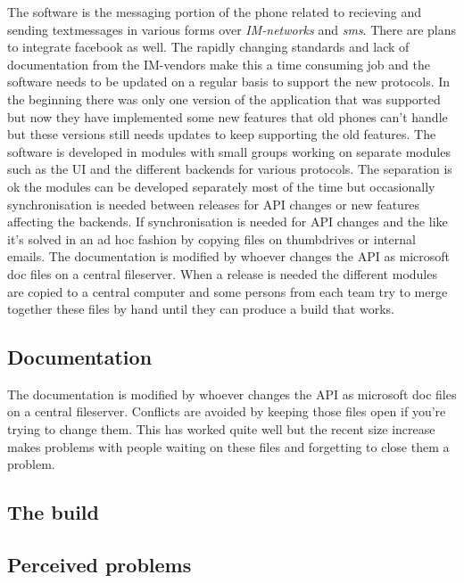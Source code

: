 \documentclass[a4paper,11pt]{article}
\begin{document}
The software is the messaging portion of the phone related to recieving and
sending textmessages in various forms over \emph{IM-networks} and  \emph{sms}.
There are plans to integrate facebook as well. The rapidly changing standards
and lack of documentation from the IM-vendors make this a time consuming job and
the software needs to be updated on a regular basis to support the new
protocols. In the beginning there was only one version of the application that
was supported but now they have implemented some new features that old phones
can't handle but these versions still needs updates to keep supporting the old
features. The software is developed in modules with small groups working on
separate modules such as the UI and the different backends for various
protocols. The separation is ok the modules can be developed separately most of
the time but occasionally synchronisation is needed between releases for API
changes or new features affecting the backends. If synchronisation is needed for
API changes and the like it's solved in an ad hoc fashion by copying files on
thumbdrives or internal emails. The documentation is modified by whoever changes
the API as microsoft doc files on a central fileserver. When a release is needed
the different modules are copied to a central computer and some persons from
each team try to merge together these files by hand until they can produce a
build that works.

\subsection{Documentation}
The documentation is modified by whoever changes the API as microsoft doc files
on a central fileserver. Conflicts are avoided by keeping those files open if
you're trying to change them. This has worked quite well but the recent size
increase makes problems with people waiting on these files and forgetting to
close them a problem.

\subsection{The build}


\subsection{Perceived problems}
\end{document}
